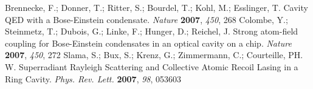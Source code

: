 \documentclass[atoms,article,submit,moreauthors,pdftex,12pt,a4paper]{mdpi}
\begin{document}
\begin{thebibliography}{999}

Brennecke, F.; Donner, T.; Ritter, S.; Bourdel, T.; Kohl, M.; Esslinger, T. Cavity QED with a Bose-Einstein condensate. {\em Nature} {\bf 2007}, {\em 450}, 268
Colombe, Y.; Steinmetz, T.; Dubois, G.; Linke, F.; Hunger, D.; Reichel, J. Strong atom-field coupling for Bose-Einstein condensates in an optical cavity on a chip. {\em Nature} {\bf 2007}, {\em 450}, 272
Slama, S.; Bux, S.; Krenz, G.; Zimmermann, C.; Courteille, PH. W. Superradiant Rayleigh Scattering and Collective Atomic Recoil Lasing in a Ring Cavity. {\em Phys. Rev. Lett.} {\bf 2007}, {\em 98}, 053603

\end{thebibliography}
\end{document}
